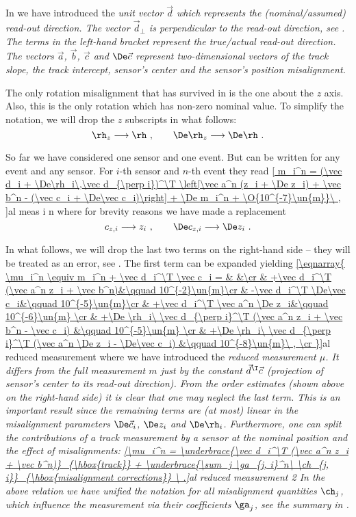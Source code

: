 In  we have introduced the \em{unit} vector $\vec d$ which represents the (nominal/assumed) \em{read-out direction}. The vector $\vec d_\perp$ is perpendicular to the read-out direction, see . The terms in the left-hand bracket represent the true/actual read-out direction. The vectors $\vec a$, $\vec b$, $\vec c$ and $\De \vec c$ represent two-dimensional vectors of the track slope, the track intercept, sensor's center and the sensor's position misalignment.

The only rotation misalignment that has survived in  is the one about the $z$ axis. Also, this is the only rotation which has non-zero nominal value. To simplify the notation, we will drop the $z$ subscripts in what follows:
$$\rh_z \longrightarrow \rh\ ,\qquad \De\rh_z \longrightarrow \De\rh\ .$$

So far we have considered one sensor and one event. But  can be written for any event and any sensor. For $i$-th sensor and $n$-th event they read
\eqref{
m_i^n = (\vec d_i + \De\rh_i\,\vec d_{\perp i})^\T \left[\vec a^n (z_i + \De z_i) + \vec b^n - (\vec c_i + \De\vec c_i)\right] + \De m_i^n + \O{10^{-7}\un{m}}\ ,
}{al meas i n}
where for brevity reasons we have made a replacement
$$c_{z,i} \longrightarrow z_i\ ,\qquad \De c_{z,i} \longrightarrow \De z_i\ .$$

In what follows, we will drop the last two terms on the right-hand side -- they will be treated as an error, see . The first term can be expanded yielding
\eqref{\eqnarray{
\mu_i^n \equiv m_i^n + \vec d_i^\T \vec c_i = & &\cr
& +\vec d_i^\T (\vec a^n z_i + \vec b^n)&\qquad 10^{-2}\un{m}\cr
& -\vec d_i^\T \De\vec c_i&\qquad 10^{-5}\un{m}\cr
& +\vec d_i^\T \vec a^n \De z_i&\qquad 10^{-6}\un{m} \cr
& +\De \rh_i\ \vec d_{\perp i}^\T (\vec a^n z_i + \vec b^n - \vec c_i) &\qquad 10^{-5}\un{m} \cr
& +\De \rh_i\ \vec d_{\perp i}^\T (\vec a^n \De z_i - \De\vec c_i) &\qquad 10^{-8}\un{m}\ , \cr
}}{al reduced measurement}
where we have introduced the \em{reduced measurement} $\mu$. It differs from the full measurement $m$ just by the constant $\vec d^\T \vec c$ (projection of sensor's center to its read-out direction). From the order estimates (shown above on the right-hand side) it is clear that one may neglect the last term. This is an important result since the remaining terms are (at most) linear in the misalignment parameters $\De \vec c_i$, $\De z_i$ and $\De \rh_i$. Furthermore, one can split the contributions of a track measurement by a sensor at the nominal position and the effect of misalignments:
\eqref{\mu_i^n =
\underbrace{\vec d_i^\T (\vec a^n z_i + \vec b^n)}_{\hbox{track}}
+
\underbrace{\sum_j \ga_{j, i}^n\ \ch_{j, i}}_{\hbox{misalignment corrections}}
\ .}{al reduced measurement 2}
In the above relation we have unified the notation for all misalignment quantities $\ch_j$, which influence the measurement via their coefficients $\ga_j$, see the summary in .

